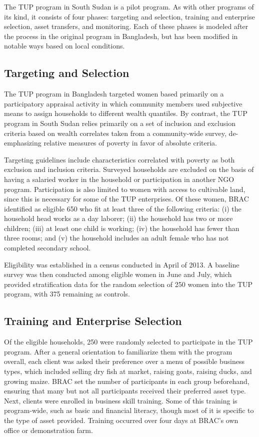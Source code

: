 \documentclass[12pt,letterpaper]{article}
\begin{document}
The TUP program in South Sudan is a pilot program.  As with other
programs of its kind, it consists of four phases: targeting and
selection, training and enterprise selection, asset transfers, and
monitoring.  Each of these phases is modeled after the process in the
original program in Bangladesh, but has been modified in notable ways
based on local conditions.

\subsection{Targeting and Selection}
\label{sec:orgheadline2}

The TUP program in Bangladesh targeted women based primarily on a
participatory appraisal activity in which community members used
subjective means to assign households to different wealth quantiles.
By contrast, the TUP program in South Sudan relies primarily on a set
of inclusion and exclusion criteria based on wealth correlates taken
from a community-wide survey, de-emphasizing relative measures of
poverty in favor of absolute criteria.               

Targeting guidelines include characteristics correlated with poverty
as both exclusion and inclusion criteria. Surveyed households are
excluded on the basis of having a salaried worker in the household or
participation in another NGO program. Participation is also limited to
women with access to cultivable land, since this is necessary for some
of the TUP enterprises.  Of these women, BRAC identified as eligible
650 who fit at least three of the following criteria: (i) the household
head works as a day laborer; (ii) the household has two or more
children; (iii) at least one child is working; (iv) the household has fewer
than three rooms; and (v) the household includes an adult female
who has not completed secondary school.

Eligibility was established in a census conducted in April of 2013. A baseline
survey was then conducted among eligible women in June and July, which provided
stratification data for the random selection of 250 women into the TUP program,
with 375 remaining as controls.

\subsection{Training and Enterprise Selection}
\label{sec:orgheadline3}

Of the eligible households, 250 were randomly selected to participate
in the TUP program. After a general orientation to familiarize them
with the program overall, each client was asked their preference over
a menu of possible business types, which included selling dry fish at
market, raising goats, raising ducks, and growing maize. BRAC set the
number of participants in each group beforehand, ensuring that many
but not all participants received their preferred asset type.  Next,
clients were enrolled in business skill training. Some of this
training is program-wide, such as basic and financial literacy,
though most of it is specific to the type of asset provided.  Training
occurred over four days at BRAC's own office or demonstration farm.
\end{document}
